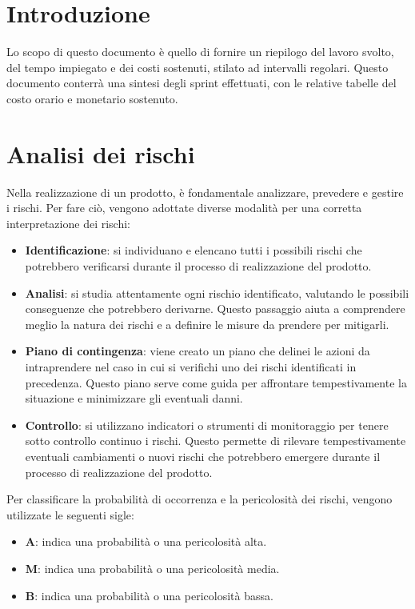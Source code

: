 \documentclass[9pt]{article}
\begin{document}
\section{Introduzione}
Lo scopo di questo documento è quello di fornire un riepilogo del lavoro svolto, del tempo impiegato e dei costi sostenuti, stilato ad intervalli regolari.
Questo documento conterrà una sintesi degli sprint effettuati, con le relative tabelle del costo orario e monetario sostenuto.

\section{Analisi dei rischi}
Nella realizzazione di un prodotto, è fondamentale analizzare, prevedere e gestire i rischi. Per fare ciò, vengono adottate diverse modalità per una corretta interpretazione dei rischi:

\begin{itemize}
	\item \textbf{Identificazione}: si individuano e elencano tutti i possibili rischi che potrebbero verificarsi durante il processo di realizzazione del prodotto.

	\item \textbf{Analisi}: si studia attentamente ogni rischio identificato, valutando le possibili conseguenze che potrebbero derivarne. Questo passaggio aiuta a comprendere meglio la natura dei rischi e a definire le misure da prendere per mitigarli.

	\item \textbf{Piano di contingenza}: viene creato un piano che delinei le azioni da intraprendere nel caso in cui si verifichi uno dei rischi identificati in precedenza. Questo piano serve come guida per affrontare tempestivamente la situazione e minimizzare gli eventuali danni.

	\item \textbf{Controllo}: si utilizzano indicatori o strumenti di monitoraggio per tenere sotto controllo continuo i rischi. Questo permette di rilevare tempestivamente eventuali cambiamenti o nuovi rischi che potrebbero emergere durante il processo di realizzazione del prodotto.
\end{itemize}
Per classificare la probabilità di occorrenza e la pericolosità dei rischi, vengono utilizzate le seguenti sigle:

\begin{itemize}
	\item \textbf{A}: indica una probabilità o una pericolosità alta.
	\item \textbf{M}: indica una probabilità o una pericolosità media.
	\item \textbf{B}: indica una probabilità o una pericolosità bassa.
\end{itemize}
\end{document}
